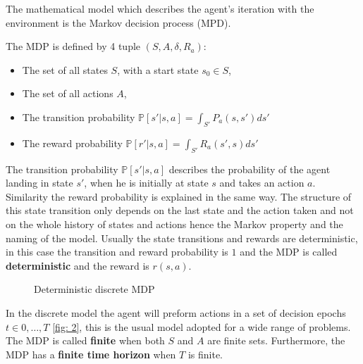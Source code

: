The mathematical model which describes the agent's iteration with the
environment is the Markov decision process (MPD).
\begin{definition}
    The MDP is defined by 4 tuple $(S, A, \delta, R_a)$:
    \begin{itemize}
        \item The set of all states $S$, with a start state $s_0 \in S$,
        \item The set of all actions $A$,
        \item The transition probability $\mathbb{P}[s'|s, a] = \int_{S'}
            P_a(s, s') ds'$
        \item The reward probability $\mathbb{P}[r'|s, a] =
            \int_{S'}R_a\left(s', s  \right)ds' $
    \end{itemize}
\end{definition}
The transition probability $\mathbb{P}[s'|s, a]$ describes the probability of
the agent landing in state $s'$, when he is initially at state $s$ and takes
an action $a$. Similarity the reward probability is explained in the same way. The
structure of this state transition only depends on the last state and the
action taken and not on the whole history of states and actions hence the
Markov property and the naming of the model. Usually the state transitions and
rewards are deterministic, in this case the transition and reward probability
is $1$ and the MDP is called \textbf{deterministic} and the reward is $r(s, a)$.
\begin{figure}[ht!]
    \centering
    \caption{Deterministic discrete MDP \label{fig: 2} \cite{ml_foundations}}
    \label{}
\end{figure}
In the discrete model the agent will preform actions in a set of decision
epochs $t \in {0,\ldots,T}$ \ref{fig: 2}, this is the usual model adopted for a wide range
of problems. The MDP is called \textbf{finite} when both $S$ and $A$ are
finite sets. Furthermore, the MDP has a \textbf{finite time horizon} when $T$
is finite.
\newline

